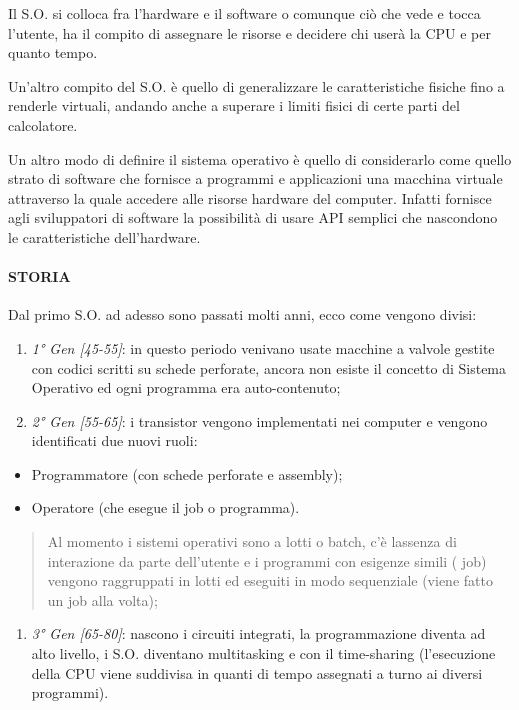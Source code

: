 Il S.O. si colloca fra l'hardware e il software o comunque ciò che vede
e tocca l'utente, ha il compito di assegnare le risorse e decidere chi
userà la CPU e per quanto tempo.

Un'altro compito del S.O. è quello di generalizzare le caratteristiche
fisiche fino a renderle virtuali, andando anche a superare i limiti
fisici di certe parti del calcolatore.

Un altro modo di definire il sistema operativo è quello di considerarlo
come quello strato di software che fornisce a programmi e applicazioni
una macchina virtuale attraverso la quale accedere alle risorse hardware
del computer. Infatti fornisce agli sviluppatori di software la
possibilità di usare API semplici che nascondono le caratteristiche
dell'hardware.

\paragraph{STORIA}\label{storia}

Dal primo S.O. ad adesso sono passati molti anni, ecco come vengono
divisi:

\begin{enumerate}
\def\labelenumi{\arabic{enumi}.}
\item
  \emph{1° Gen {[}45-55{]}}: in questo periodo venivano usate macchine a
  valvole gestite con codici scritti su schede perforate, ancora non
  esiste il concetto di Sistema Operativo ed ogni programma era
  auto-contenuto;
\item
  \emph{2° Gen {[}55-65{]}}: i transistor vengono implementati nei
  computer e vengono identificati due nuovi ruoli:
\end{enumerate}

\begin{itemize}
\item
  Programmatore (con schede perforate e assembly);
\item
  Operatore (che esegue il job o programma).
\end{itemize}

\begin{quote}
Al momento i sistemi operativi sono a lotti o batch, c'è
l\textquotesingle assenza di interazione da parte dell'utente e i
programmi con esigenze simili ( job) vengono raggruppati in lotti ed
eseguiti in modo sequenziale (viene fatto un job alla volta);
\end{quote}

\begin{enumerate}
\def\labelenumi{\arabic{enumi}.}
\setcounter{enumi}{2}
\item
  \emph{3° Gen {[}65-80{]}}: nascono i circuiti integrati, la
  programmazione diventa ad alto livello, i S.O. diventano multitasking
  e con il time-sharing (l'esecuzione della CPU viene suddivisa in
  quanti di tempo assegnati a turno ai diversi programmi).
\end{enumerate}

